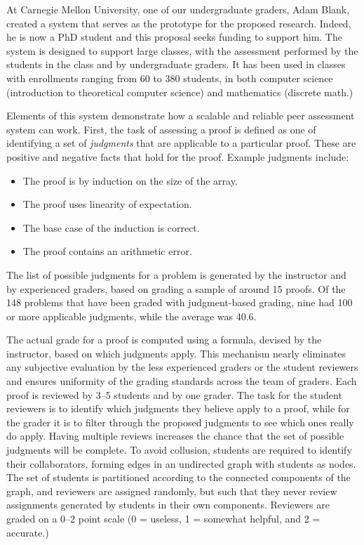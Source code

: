 \documentclass[12pt]{article}
\begin{document}
At Carnegie Mellon University, one of our undergraduate graders, Adam
Blank, created a system that serves as the prototype for the proposed
research.  Indeed, he is now a PhD student and this proposal seeks
funding to support him.  The system is designed to support large classes,
with the assessment performed by the students in the class and by
undergraduate graders.  It has been used in classes with enrollments
ranging from 60 to 380 students, in both computer science (introduction
to theoretical computer science) and mathematics (discrete math.)

Elements of this system demonstrate 
how a scalable and reliable peer assessment system can work.  First,
the task of assessing a proof is defined as one of identifying a set of
{\em judgments} that are applicable to a particular proof.  These are
positive and negative facts that hold for the proof.  Example
judgments include:
\begin{itemize}
\item The proof is by induction on the size of the array.
\item The proof uses linearity of expectation.
\item The base case of the induction is correct.
\item The proof contains an arithmetic error.
\end{itemize}
The list of possible judgments for a problem is generated by the
instructor and by experienced graders, based on grading a sample of
around 15 proofs.  Of the 148 problems that have been graded with
judgment-based grading, nine had 100 or more applicable judgments,
while the average was 40.6.  

The actual grade for a proof is computed using a formula, devised
by the instructor, based on which judgments apply.  This mechanism
nearly eliminates any subjective evaluation by the less experienced graders
or the student reviewers and ensures uniformity of the grading
standards across the team of graders.  Each proof is reviewed by 3--5
students and by one grader.  The task for the student reviewers is to
identify which judgments they believe apply to a proof, while for the
grader it is to filter through the proposed judgments to see which
ones really do apply.  Having multiple reviews increases the chance
that the set of possible judgments will be complete.  To avoid
collusion, students are required to identify their collaborators,
forming edges in an undirected graph with students as nodes.  The
set of students is partitioned according to the connected components
of the graph, and
reviewers are assigned randomly, but such that they never review
assignments generated by students in their own components.  Reviewers
are graded on a 0--2 point scale (0 = useless, 1 = somewhat helpful,
and 2 = accurate.)
\end{document}
